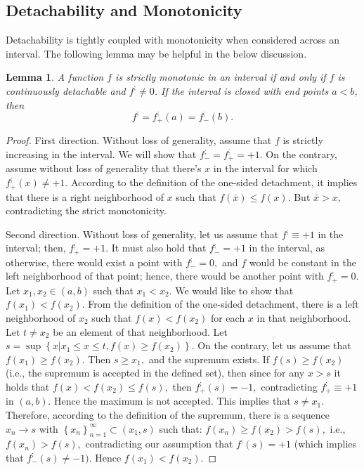 \documentclass[11pt]{book}
\newtheorem{lem}[thm]{Lemma}
\begin{document}
\subsection{Detachability and Monotonicity}
Detachability is tightly coupled with monotonicity when considered across an interval. The following lemma may be helpful in the below discussion.

\begin{lem}\label{monotonicity}A function $f$ is strictly monotonic in an interval if and only if $f$ is continuously detachable and  $f^{;}\neq 0$. If the interval is closed with end points $a<b$, then $$f^{;}=f^{;}_{+}\left(a\right)=f^{;}_{-}\left(b\right).$$
\end{lem}
\begin{proof}First direction. Without loss of generality, assume that $f$ is strictly increasing in the interval. We will show that $f_{-}^{;}=f_{+}^{;}=+1.$ On the contrary, assume without loss of generality that there's $x$ in the interval for which $f_{+}^{;}\left(x\right)\neq+1.$ According to the definition of the one-sided detachment, it implies that there is a right neighborhood of $x$ such that $f\left(\bar{x}\right)\leq f\left(x\right).$ But $\bar{x}>x,$ contradicting the strict monotonicity.

Second direction. Without loss of generality, let us assume that $f^{;}\equiv+1$ in the interval; then, $f_{+}^{;}=+1$. It must also hold that $f_{-}^{;}=+1$ in the interval, as otherwise, there would exist a point with $f_{-}^{;}=0,$ and $f$ would be constant in the left neighborhood of that point; hence, there would be another point with $f_{+}^{;}=0.$
Let $x_{1},x_{2} \in \left( a,b \right)$ such that $x_{1}<x_{2}.$ We would like to show that $f\left(x_{1}\right)<f\left(x_{2}\right).$ From the definition of the one-sided detachment, there is a left neighborhood of $x_{2}$ such that $f\left(x\right)<f\left(x_{2}\right)$ for each $x$ in that neighborhood. Let $t\neq x_{2}$ be an element of that neighborhood. Let $s=\sup\left\{ x|x_{1}\leq x\leq t,f\left(x\right)\geq f\left(x_{2}\right)\right\}.$ On the contrary, let us assume that $f\left(x_{1}\right)\geq f\left(x_{2}\right).$ Then $s\geq x_{1},$ and the supremum exists. If $f\left(s\right)\geq f\left(x_{2}\right)$ (i.e., the supremum is accepted in the defined set), then since for any $x>s$ it holds that $f\left(x\right)<f\left(x_{2}\right)\leq f\left(s\right),$ then $f_{+}^{;}\left(s\right)=-1,$ contradicting $f_{+}^{;}\equiv+1$ in $\left(a,b\right).$ Hence the maximum is not accepted. This implies that $s\neq x_{1}.$ Therefore, according to the definition of the supremum, there is a sequence $x_{n}\rightarrow s$ with $\left\{ x_{n}\right\} _{n=1}^{\infty}\subset\left(x_{1},s\right)$ such that: $f\left(x_{n}\right)\geq f\left(x_{2}\right)>f\left(s\right),$ i.e., $f\left(x_{n}\right)>f\left(s\right),$ contradicting our assumption that $f^{;}\left(s\right)=+1$ (which implies that $f_{-}^{;}\left(s\right)\neq-1).$ Hence $f\left(x_{1}\right)<f\left(x_{2}\right).$


\end{proof}
\end{document}
